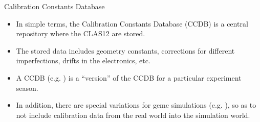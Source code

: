 \begin{frame}{}
    \centering \Huge{}
\end{frame}

\begin{frame}{Calibration Constants Database}
    \label{20.01::ccdb}
    \begin{itemize}
        \item
        \vspace{12pt}
        In simple terms, the Calibration Constants Database (CCDB) is a central repository where the CLAS12  are stored.
        \item
            The stored data includes geometry constants, corrections for different imperfections, drifts in the electronics, etc.

        \vspace{12pt}
        \item
            A CCDB  (e.g. ) is a ``version'' of the CCDB for a particular experiment season.

        \vspace{12pt}
        \item
            In addition, there are special variations for gemc simulations (e.g. ), so as to not include calibration data from the real world into the simulation world.
    \end{itemize}

\end{frame}

